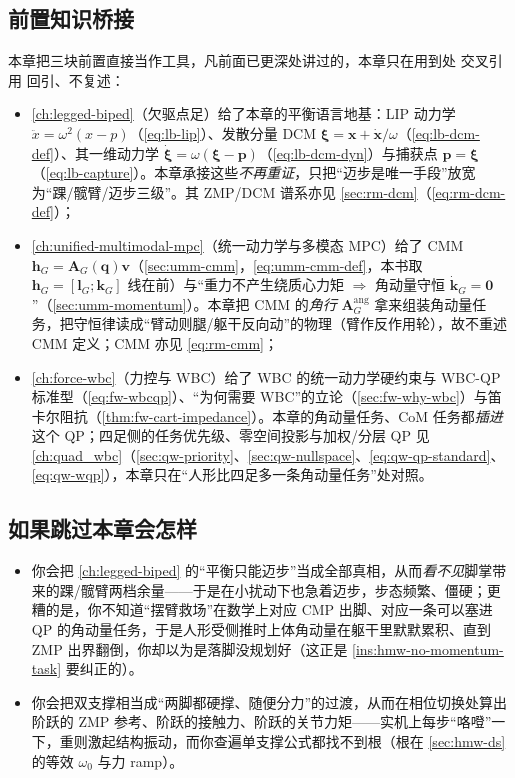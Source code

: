 \subsection*{前置知识桥接}
本章把三块前置直接当作工具，凡前面已更深处讲过的，本章只在用到处 交叉引用 回引、不复述：
\begin{itemize}
  \item \cref{ch:legged-biped}（欠驱点足）给了本章的平衡语言地基：LIP 动力学 $\ddot x=\omega^2(x-p)$（\cref{eq:lb-lip}）、发散分量 DCM $\boldsymbol\xi=\mathbf x+\dot{\mathbf x}/\omega$（\cref{eq:lb-dcm-def}）、其一维动力学 $\dot{\boldsymbol\xi}=\omega(\boldsymbol\xi-\mathbf p)$（\cref{eq:lb-dcm-dyn}）与捕获点 $\mathbf p=\boldsymbol\xi$（\cref{eq:lb-capture}）。本章承接这些\emph{不再重证}，只把“迈步是唯一手段”放宽为“踝/髋臂/迈步三级”。其 ZMP/DCM 谱系亦见 \cref{sec:rm-dcm}（\cref{eq:rm-dcm-def}）；
  \item \cref{ch:unified-multimodal-mpc}（统一动力学与多模态 MPC）给了 CMM $\mathbf h_G=\mathbf A_G(\mathbf q)\mathbf v$（\cref{sec:umm-cmm}，\cref{eq:umm-cmm-def}，本书取 $\mathbf h_G=[\mathbf l_G;\mathbf k_G]$ 线在前）与“重力不产生绕质心力矩 $\Rightarrow$ 角动量守恒 $\dot{\mathbf k}_G=\mathbf 0$”（\cref{sec:umm-momentum}）。本章把 CMM 的\emph{角行} $\mathbf A_G^{\mathrm{ang}}$ 拿来组装角动量任务，把守恒律读成“臂动则腿/躯干反向动”的物理（臂作反作用轮），故不重述 CMM 定义；CMM 亦见 \cref{eq:rm-cmm}；
  \item \cref{ch:force-wbc}（力控与 WBC）给了 WBC 的统一动力学硬约束与 WBC-QP 标准型（\cref{eq:fw-wbcqp}）、“为何需要 WBC”的立论（\cref{sec:fw-why-wbc}）与笛卡尔阻抗（\cref{thm:fw-cart-impedance}）。本章的角动量任务、CoM 任务都\emph{插进}这个 QP；四足侧的任务优先级、零空间投影与加权/分层 QP 见 \cref{ch:quad_wbc}（\cref{sec:qw-priority}、\cref{sec:qw-nullspace}、\cref{eq:qw-qp-standard}、\cref{eq:qw-wqp}），本章只在“人形比四足多一条角动量任务”处对照。
\end{itemize}

\subsection*{如果跳过本章会怎样}
\begin{itemize}
  \item 你会把 \cref{ch:legged-biped} 的“平衡只能迈步”当成全部真相，从而\emph{看不见}脚掌带来的踝/髋臂两档余量——于是在小扰动下也急着迈步，步态频繁、僵硬；更糟的是，你不知道“摆臂救场”在数学上对应 CMP 出脚、对应一条可以塞进 QP 的角动量任务，于是人形受侧推时上体角动量在躯干里默默累积、直到 ZMP 出界翻倒，你却以为是落脚没规划好（这正是 \cref{ins:hmw-no-momentum-task} 要纠正的）。
  \item 你会把双支撑相当成“两脚都硬撑、随便分力”的过渡，从而在相位切换处算出阶跃的 ZMP 参考、阶跃的接触力、阶跃的关节力矩——实机上每步“咯噔”一下，重则激起结构振动，而你查遍单支撑公式都找不到根（根在 \cref{sec:hmw-ds} 的等效 $\omega_0$ 与力 ramp）。
\end{itemize}

